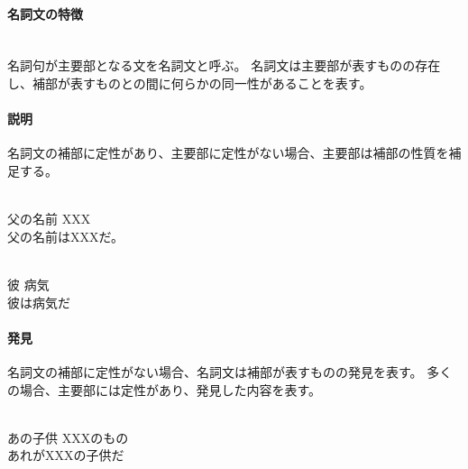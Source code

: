 \paragraph{名詞文の特徴}\quad\\
名詞句が主要部となる文を名詞文と呼ぶ。
名詞文は主要部が表すものの存在し、補部が表すものとの間に何らかの同一性があることを表す。

\paragraph{説明}
名詞文の補部に定性があり、主要部に定性がない場合、主要部は補部の性質を補足する。

\begin{exe}
    \ex \gll [u\'ak\'a ap\'a piku\'o] [XXX] \\
        父の名前 XXX \\
    \glt 父の名前はXXXだ。
\end{exe}
\begin{exe}
    \ex \gll [k\'ap\'a] [k\'um\'am\textipa{E}] \\
        彼 病気 \\
    \glt 彼は病気だ
\end{exe}

\paragraph{発見}
名詞文の補部に定性がない場合、名詞文は補部が表すものの発見を表す。
多くの場合、主要部には定性があり、発見した内容を表す。

\begin{exe}
    \ex \gll [r\'i\'i mipop\'a] [XXX k\'a\'a] \\
        あの子供 XXXのもの \\
    \glt あれがXXXの子供だ
\end{exe}
